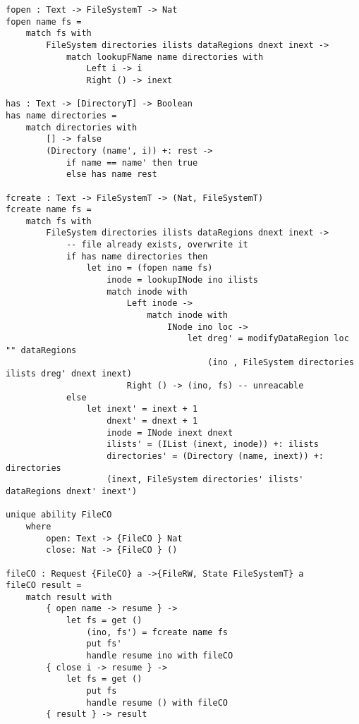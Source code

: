 \documentclass[logo,bsc,singlespacing,parskip]{infthesis}
\begin{document}
\begin{lstlisting}[language=unison]
fopen : Text -> FileSystemT -> Nat
fopen name fs = 
    match fs with
        FileSystem directories ilists dataRegions dnext inext ->
            match lookupFName name directories with
                Left i -> i
                Right () -> inext

has : Text -> [DirectoryT] -> Boolean
has name directories =
    match directories with
        [] -> false
        (Directory (name', i)) +: rest ->
            if name == name' then true
            else has name rest

fcreate : Text -> FileSystemT -> (Nat, FileSystemT)
fcreate name fs = 
    match fs with 
        FileSystem directories ilists dataRegions dnext inext ->
            -- file already exists, overwrite it
            if has name directories then 
                let ino = (fopen name fs)
                    inode = lookupINode ino ilists
                    match inode with
                        Left inode -> 
                            match inode with 
                                INode ino loc ->
                                    let dreg' = modifyDataRegion loc "" dataRegions
                                        (ino , FileSystem directories ilists dreg' dnext inext)
                        Right () -> (ino, fs) -- unreacable
            else 
                let inext' = inext + 1
                    dnext' = dnext + 1
                    inode = INode inext dnext
                    ilists' = (IList (inext, inode)) +: ilists
                    directories' = (Directory (name, inext)) +: directories
                    (inext, FileSystem directories' ilists' dataRegions dnext' inext')

unique ability FileCO
    where
        open: Text -> {FileCO } Nat
        close: Nat -> {FileCO } ()

fileCO : Request {FileCO} a ->{FileRW, State FileSystemT} a
fileCO result =
    match result with
        { open name -> resume } ->
            let fs = get ()
                (ino, fs') = fcreate name fs
                put fs'
                handle resume ino with fileCO
        { close i -> resume } ->
            let fs = get ()
                put fs
                handle resume () with fileCO
        { result } -> result


\end{lstlisting}
\end{document}
